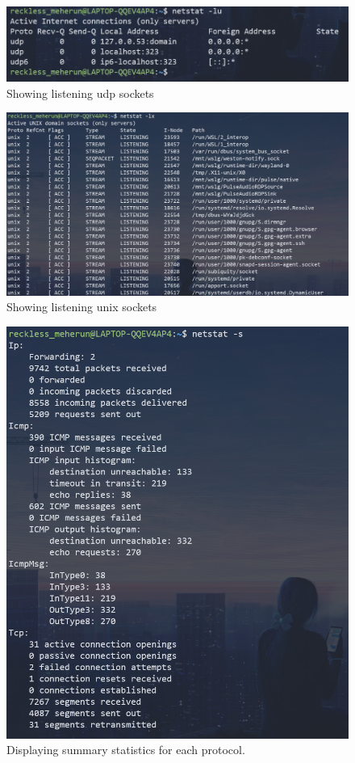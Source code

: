 \documentclass[11pt]{article}
\begin{document}
\begin{figure}[H]
	\centering
	\includegraphics[width=\textwidth]{res/netstat 7.png}
	\caption{Showing listening udp sockets}
\end{figure}
\begin{figure}[H]
	\centering
	\includegraphics[width=\textwidth]{res/netstat 8.png}
	\caption{Showing listening unix sockets}
\end{figure}
\begin{figure}[H]
	\centering
	\includegraphics[width=\textwidth]{res/netstat 9.png}
	\caption{Displaying summary statistics for each protocol.}
\end{figure}
\end{document}
